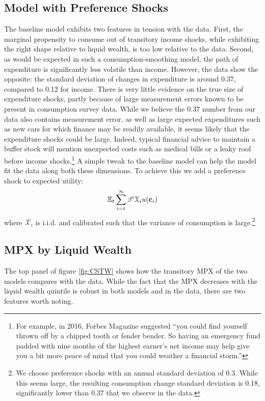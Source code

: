 \documentclass[titlepage]{\econtex}\newcommand{\texname}{ConsumptionHeterogeneity}
\begin{document}
\subsection{Model with Preference Shocks}
The baseline model exhibits two features in tension with the data. First, the marginal propensity to consume out of transitory income shocks, while exhibiting the right shape relative to liquid wealth, is too low relative to the data. Second, as would be expected in such a consumption-smoothing model, the path of expenditure is significantly less volatile than income. However, the data show the opposite: the standard deviation of changes in expenditure is around 0.37, compared to 0.12 for income. There is very little evidence on the true size of expenditure shocks, partly because of large measurement errors known to be present in consumption survey data. While we believe the 0.37 number from our data also contains measurement error, as well as large expected expenditures such as new cars for which finance may be readily available, it seems likely that the expenditure shocks could be large. Indeed, typical financial advice to maintain a buffer stock will mention unexpected costs such as medical bills or a leaky roof before income shocks.\footnote{For example, in 2016,  Forbes Magazine suggested ``you could find yourself thrown off by a chipped tooth or fender bender. So having an emergency fund padded with nine months of the highest earner's net income may help give you a bit more peace of mind that you could weather a financial storm.''} A simple tweak to the baseline model can help the model fit the data along both these dimensions. To achieve this we add a preference shock to expected utility:
\begin{align*}
\mathbb{E}_t \sum_{i=t}^{\infty} \beta^i \mathcal{X}_i u(\mathbf{c}_i)
\end{align*}
where $\mathcal{X}_i$ is i.i.d. and calibrated such that the variance of consumption is large.\footnote{We choose preference shocks with an annual standard deviation of 0.3. While this seems large, the resulting consumption change standard deviation is 0.18, significantly lower than 0.37 that we observe in the data.}

\subsection{MPX by Liquid Wealth} 
The top panel of figure \ref{fig:CSTW} shows how the transitory MPX of the two models compares with the data. While the fact that the MPX decreases with the liquid wealth quintile is robust in both models and in the data, there are two features worth noting. 
\end{document}
